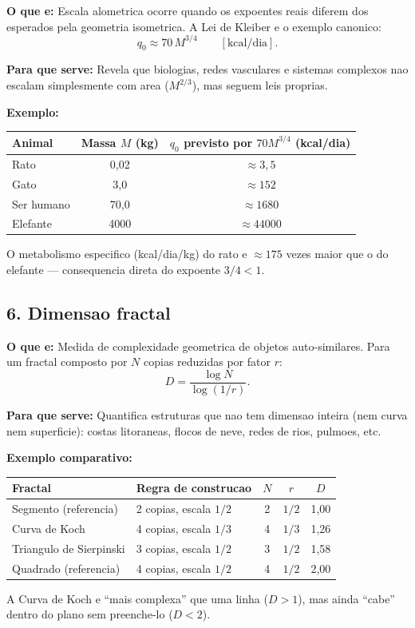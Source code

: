 \documentclass[12pt,a4paper,oneside]{book}
\theoremstyle{definition}
\begin{document}
\textbf{O que e:}
Escala alometrica ocorre quando os expoentes reais diferem dos esperados pela
geometria isometrica. A Lei de Kleiber e o exemplo canonico:
\[
q_0 \approx 70\,M^{3/4} \qquad [\text{kcal/dia}].
\]

\textbf{Para que serve:}
Revela que biologias, redes vasculares e sistemas complexos nao escalam
simplesmente com area ($M^{2/3}$), mas seguem leis proprias.

\textbf{Exemplo:}
\begin{center}
\begin{tabular}{lcc}
\toprule
Animal & Massa $M$ (kg) & $q_0$ previsto por $70M^{3/4}$ (kcal/dia) \\
\midrule
Rato       & 0{,}02 & $\approx 3{,}5$ \\
Gato       & 3{,}0  & $\approx 152$  \\
Ser humano & 70{,}0 & $\approx 1680$ \\
Elefante   & 4000   & $\approx 44000$\\
\bottomrule
\end{tabular}
\end{center}
O metabolismo especifico (kcal/dia/kg) do rato e $\approx 175$ vezes maior que
o do elefante --- consequencia direta do expoente $3/4 < 1$.

\subsection*{6. Dimensao fractal}

\textbf{O que e:}
Medida de complexidade geometrica de objetos auto-similares.
Para um fractal composto por $N$ copias reduzidas por fator $r$:
\[
D = \frac{\log N}{\log(1/r)}.
\]

\textbf{Para que serve:}
Quantifica estruturas que nao tem dimensao inteira (nem curva nem superficie):
costas litoraneas, flocos de neve, redes de rios, pulmoes, etc.

\textbf{Exemplo comparativo:}
\begin{center}
\begin{tabular}{llccc}
\toprule
Fractal & Regra de construcao & $N$ & $r$ & $D$ \\
\midrule
Segmento (referencia) & 2 copias, escala $1/2$ & 2 & $1/2$ & 1{,}00 \\
Curva de Koch         & 4 copias, escala $1/3$ & 4 & $1/3$ & 1{,}26 \\
Triangulo de Sierpinski & 3 copias, escala $1/2$ & 3 & $1/2$ & 1{,}58 \\
Quadrado (referencia) & 4 copias, escala $1/2$ & 4 & $1/2$ & 2{,}00 \\
\bottomrule
\end{tabular}
\end{center}
A Curva de Koch e ``mais complexa'' que uma linha ($D>1$), mas ainda ``cabe'' dentro
do plano sem preenche-lo ($D<2$).
\end{document}
